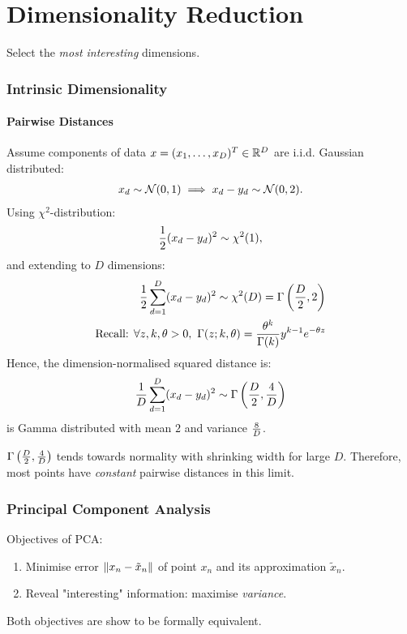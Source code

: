 \part{Dimensionality Reduction}
Select the \emph{most interesting} dimensions. 

\section{Intrinsic Dimensionality}
\subsection*{Pairwise Distances}
Assume components of data $x=(x_1,\ldots,x_D)^T \in \mathbb{R}^D$ are i.i.d. Gaussian distributed:
\begin{align*}
    x_d \sim \mathcal N(0,1) \implies x_d - y_d \sim \mathcal N(0,2).
\end{align*}
Using $\chi^2$-distribution:
\begin{align*}
    {1\over 2}(x_d-y_d)^2 \sim \chi^2(1),
\end{align*}
and extending to $D$ dimensions:
\begin{align*}
    {1\over 2} \sum_{d=1}^D (x_d-y_d)^2 \sim \chi^2(D) = \Gamma\left( {D\over 2}, 2\right)\\
    \text{Recall: } \forall z,k, \theta > 0,\ \Gamma(z;k,\theta) = {\theta^k\over \Gamma(k)} y^{k-1} e^{-\theta z} 
\end{align*}
Hence, the dimension-normalised squared distance is:
\begin{align*}
    {1\over D} \sum_{d=1}^D (x_d-y_d)^2 \sim \Gamma\left({D\over 2}, {4\over D}\right)
\end{align*}
is Gamma distributed with mean $2$ and variance ${8 \over D}$. 

$\Gamma\left({D\over 2}, {4\over D}\right)$  tends towards normality with shrinking width for large $D$. Therefore, most points have \emph{constant} pairwise distances in this limit.

\section{Principal Component Analysis}
Objectives of PCA:
\begin{enumerate}
\item Minimise error $\left\lVert x_n-\tilde{x}_n\right\rVert$ of point $x_n$ and its approximation $\tilde x_n$.
\item Reveal "interesting" information: maximise \emph{variance}.
\end{enumerate}
Both objectives are show to be formally equivalent.

